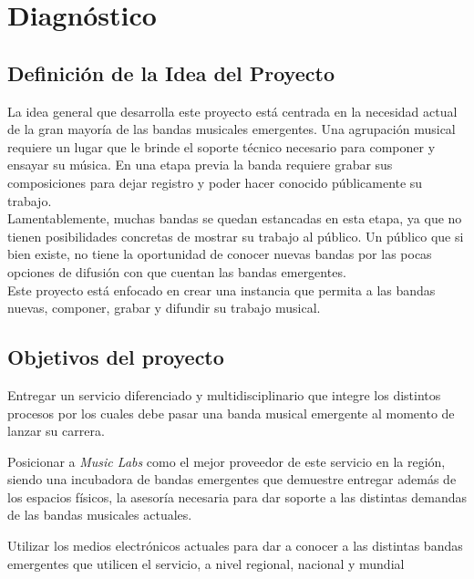 \section{Diagnóstico}

\subsection{Definición de la Idea del Proyecto}
La idea general que desarrolla este proyecto está centrada en la necesidad 
actual de la gran mayoría de las bandas musicales emergentes. Una agrupación 
musical requiere un lugar que le brinde el soporte técnico necesario 
para componer y ensayar su música. En una etapa previa la banda 
requiere grabar sus composiciones para dejar registro y poder hacer 
conocido públicamente su trabajo. \\

Lamentablemente, muchas bandas se quedan estancadas en esta etapa, ya 
que no tienen posibilidades concretas de mostrar su trabajo al 
público. Un público que si bien existe, no tiene la oportunidad de 
conocer nuevas bandas por las pocas opciones de difusión con que 
cuentan las bandas emergentes.\\

Este proyecto está enfocado en crear una instancia que permita a las 
bandas nuevas, componer, grabar y difundir su trabajo musical. 

\subsection{Objetivos del proyecto}
	Entregar un servicio diferenciado y multidisciplinario 
	que integre los distintos procesos por los cuales 
	debe pasar una banda musical emergente al momento 
	de lanzar su carrera. 
	
	Posicionar a \emph{Music Labs} como el mejor
	proveedor de este servicio en la región, siendo una incubadora
	de bandas emergentes que demuestre
	entregar además de los espacios físicos,
	la asesoría necesaria para dar soporte a las distintas demandas de las 
	bandas musicales actuales.

	Utilizar los medios electrónicos actuales
	para dar a conocer a las distintas bandas
	emergentes que utilicen el servicio,
	a nivel regional, nacional y mundial

